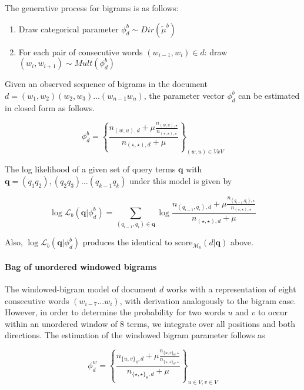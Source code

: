 \documentclass[]{article}
\begin{document}
The generative process for bigrams is as follows:
\begin{enumerate}
\item Draw categorical parameter $\phi_{d}^{b}\sim Dir(\tilde{\mu}^{b})$
\item For each pair of consecutive words $(w_{i-1},w_{i})\in d$: draw $(w_{i},w_{i+1})\sim Mult(\phi_{d}^{b})$
\end{enumerate}
Given an observed sequence of bigrams in the document $d=(w_{1},w_{2})(w_{2},w_{3})\dots(w_{n-1}w_{n})$,
the parameter vector $\phi_{d}^{b}$ can be estimated in closed form
as follows.

\[
\phi_{d}^{b}=\left\{ \frac{n_{(w,u),d}+\mu\frac{n_{(w,u),\star}}{n_{(\star,\star),\star}}}{n_{(\star,\star),d}+\mu}\right\} _{(w,u)\in VxV}
\]

The log likelihood of a given set of query terms $\mathbf{q}$ with\\
 $\mathbf{q}=(q_{1}q_{2}),(q_{2}q_{3})\dots(q_{k-1}q_{k})$
under this model is given by

\[
\log\mathcal{L}_{b}(\mathbf{q}|\phi_{d}^{b})=\sum_{(q_{i-1},q_{i})\in\mathbf{q}}\log\frac{n_{(q_{i-1},q_{i}),d}+\mu\frac{n_{(q_{i-1},q_{i}),\star}}{n_{(\star,\star),\star}}}{n_{(\star,\star),d}+\mu}
\]

Also, $\log\mathcal{L}_{b}(\mathbf{q}|\phi_{d}^{b})$ produces the
identical to $\mbox{score}_{\mathcal{M}_{b}}(d|\mathbf{q})$ above.

\paragraph{Bag of unordered windowed bigrams}

The windowed-bigram model of document $d$ works with a representation
of eight consecutive words $(w_{i-7}\dots w_{i})$, with derivation
analogously to the bigram case. However, in order to determine the
probability for two words $u$ and $v$ to occur within an unordered
window of 8 terms, we integrate over all positions and both directions.
The estimation of the windowed bigram parameter follows as

\[
\phi_{d}^{w}=\left\{ \frac{n_{\{u,v\}_{8},d}+\mu\frac{n_{\{u,v\}_{8},\star}}{n_{\{\star,\star\}_{8},\star}}}{n_{\{\star,\star\}_{8},d}+\mu}\right\} _{u\in V,v\in V}
\]
\end{document}
